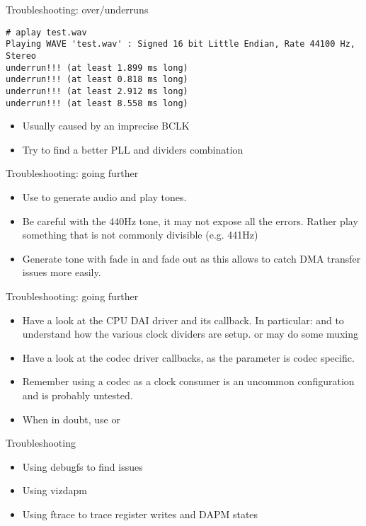 \begin{frame}[fragile]{Troubleshooting: over/underruns}
  \begin{block}{}
    \fontsize{10}{10}\selectfont
    \begin{verbatim}
# aplay test.wav 
Playing WAVE 'test.wav' : Signed 16 bit Little Endian, Rate 44100 Hz, Stereo
underrun!!! (at least 1.899 ms long)
underrun!!! (at least 0.818 ms long)
underrun!!! (at least 2.912 ms long)
underrun!!! (at least 8.558 ms long)
    \end{verbatim}
  \end{block}
  \begin{itemize}
  \item Usually caused by an imprecise BCLK
  \item Try to find a better PLL and dividers combination
  \end{itemize}
\end{frame}

\begin{frame}{Troubleshooting: going further}
  \begin{itemize}
  \item Use  to generate audio and play tones.
  \item Be careful with the 440Hz tone, it may not expose all the
    errors. Rather play something that is not commonly divisible (e.g.
    441Hz)
  \item Generate tone with fade in and fade out as this allows to
    catch DMA transfer issues more easily.
  \end{itemize}
\end{frame}

\begin{frame}{Troubleshooting: going further}
  \begin{itemize}
  \item Have a look at the CPU DAI driver and its callback. In
    particular:  and  to
    understand how the various clock dividers are setup.
     or  may do some muxing
  \item Have a look at the codec driver callbacks, 
    as the  parameter is codec specific.
  \item Remember using a codec as a clock consumer is an uncommon
    configuration and is probably untested.
  \item When in doubt, use  or 
  \end{itemize}
\end{frame}

\setupdemoframe
{Troubleshooting}
{
  \begin{itemize}
  \item Using debugfs to find issues
  \item Using vizdapm
  \item Using ftrace to trace register writes and DAPM states
  \end{itemize}
}
